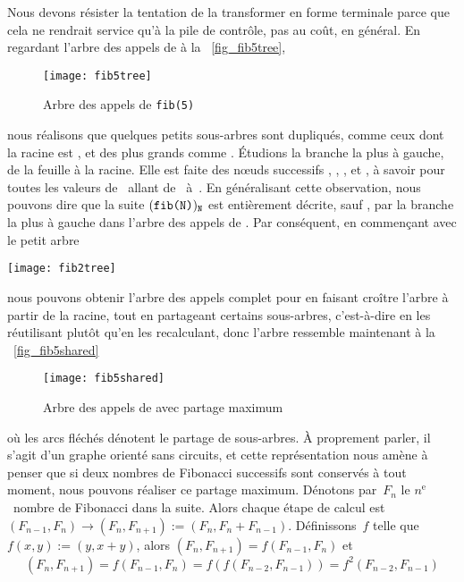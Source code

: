 Nous devons résister la tentation de la transformer en forme terminale
parce que cela ne rendrait service qu'à la pile de contrôle, pas au
coût, en général. En regardant l'arbre des appels de 
à la \fig~\vref{fig_fib5tree},
\begin{figure}[b]
\centering
\texttt{[image: fib5tree]}
\caption{Arbre des appels de \texttt{fib(5)}\label{fig_fib5tree}}
\end{figure}
nous réalisons que quelques petits sous-arbres sont dupliqués, comme
ceux dont la racine est , et des plus grands comme
. Étudions la branche la plus à gauche, de la feuille
à la racine. Elle est faite des n{\oe}uds successifs ,
, ,  et
, à savoir  pour toutes les valeurs
de~ allant de~ à~. En généralisant
cette observation, nous pouvons dire que la suite
\((\texttt{fib(N)})_{\texttt{N}}\) est entièrement décrite, sauf
, par la branche la plus à gauche dans l'arbre des
appels de . Par conséquent, en commençant avec le
petit arbre
\begin{center}
\texttt{[image: fib2tree]}
\end{center}
nous pouvons obtenir l'arbre des appels complet pour 
en faisant croître l'arbre à partir de la racine, tout en partageant
certains sous-arbres, c'est-à-dire en les réutilisant plutôt qu'en les
recalculant, donc l'arbre ressemble maintenant à la
\fig~\vref{fig_fib5shared}
\begin{figure}
\centering
\texttt{[image: fib5shared]}
\caption{Arbre des appels de  avec partage maximum
\label{fig_fib5shared}}
\end{figure}
où les arcs fléchés dénotent le partage de sous-arbres. À proprement
parler, il s'agit d'un graphe orienté sans circuits, et cette
représentation nous amène à penser que si deux nombres de Fibonacci
successifs sont conservés à tout moment, nous pouvons réaliser ce
partage maximum. Dénotons par~\(F_n\) le \(n^\text{e}\)~nombre de
Fibonacci dans la suite. Alors chaque étape de calcul est
\((F_{n-1},F_{n}) \rightarrow (F_{n}, F_{n+1}) :=
(F_{n},F_{n}+F_{n-1})\). Définissons~\(f\) telle que \(f(x,y) :=
(y,x+y)\), alors \((F_{n},F_{n+1}) = f(F_{n-1},F_{n})\) et
\begin{equation*}
(F_n,F_{n+1}) = f(F_{n-1},F_{n}) = f(f(F_{n-2},F_{n-1})) =
f^2(F_{n-2},F_{n-1})
\end{equation*}
